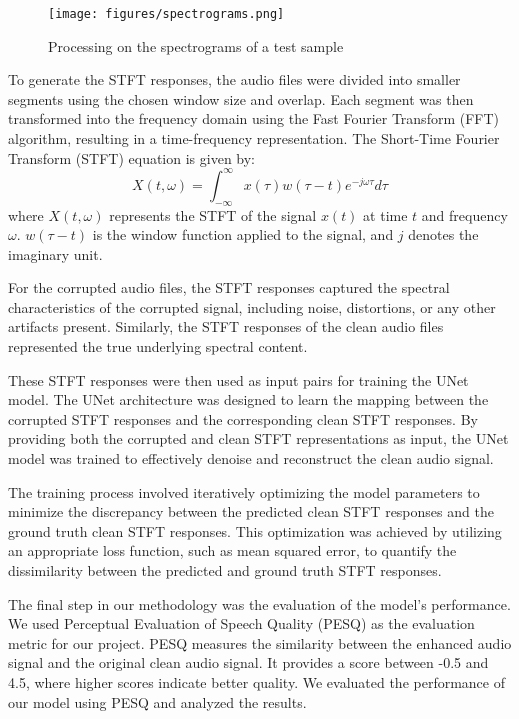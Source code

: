 \documentclass[conference]{IEEEtran}
\begin{document}
\begin{figure*}[t!]
    \centering
    \texttt{[image: figures/spectrograms.png]}
    \caption{Processing on the spectrograms of a test sample}
\end{figure*}

To generate the STFT responses, the audio files were divided into smaller segments using the chosen window size and overlap. Each segment was then transformed into the frequency domain using the Fast Fourier Transform (FFT) algorithm, resulting in a time-frequency representation.
The Short-Time Fourier Transform (STFT) equation is given by:
\begin{equation*}
    X(t, \omega) = \int_{-\infty}^{\infty} x(\tau) w(\tau - t) e^{-j\omega\tau} d\tau
\end{equation*}
where $X(t, \omega)$ represents the STFT of the signal $x(t)$ at time $t$ and frequency $\omega$. $w(\tau - t)$ is the window function applied to the signal, and $j$ denotes the imaginary unit.

For the corrupted audio files, the STFT responses captured the spectral characteristics of the corrupted signal, including noise, distortions, or any other artifacts present. Similarly, the STFT responses of the clean audio files represented the true underlying spectral content.

These STFT responses were then used as input pairs for training the UNet model. The UNet architecture was designed to learn the mapping between the corrupted STFT responses and the corresponding clean STFT responses. By providing both the corrupted and clean STFT representations as input, the UNet model was trained to effectively denoise and reconstruct the clean audio signal.

The training process involved iteratively optimizing the model parameters to minimize the discrepancy between the predicted clean STFT responses and the ground truth clean STFT responses. This optimization was achieved by utilizing an appropriate loss function, such as mean squared error, to quantify the dissimilarity between the predicted and ground truth STFT responses. 

The final step in our methodology was the evaluation of the model's performance. We used Perceptual Evaluation of Speech Quality (PESQ) as the evaluation metric for our project. PESQ measures the similarity between the enhanced audio signal and the original clean audio signal. It provides a score between -0.5 and 4.5, where higher scores indicate better quality. We evaluated the performance of our model using PESQ and analyzed the results.
\end{document}
